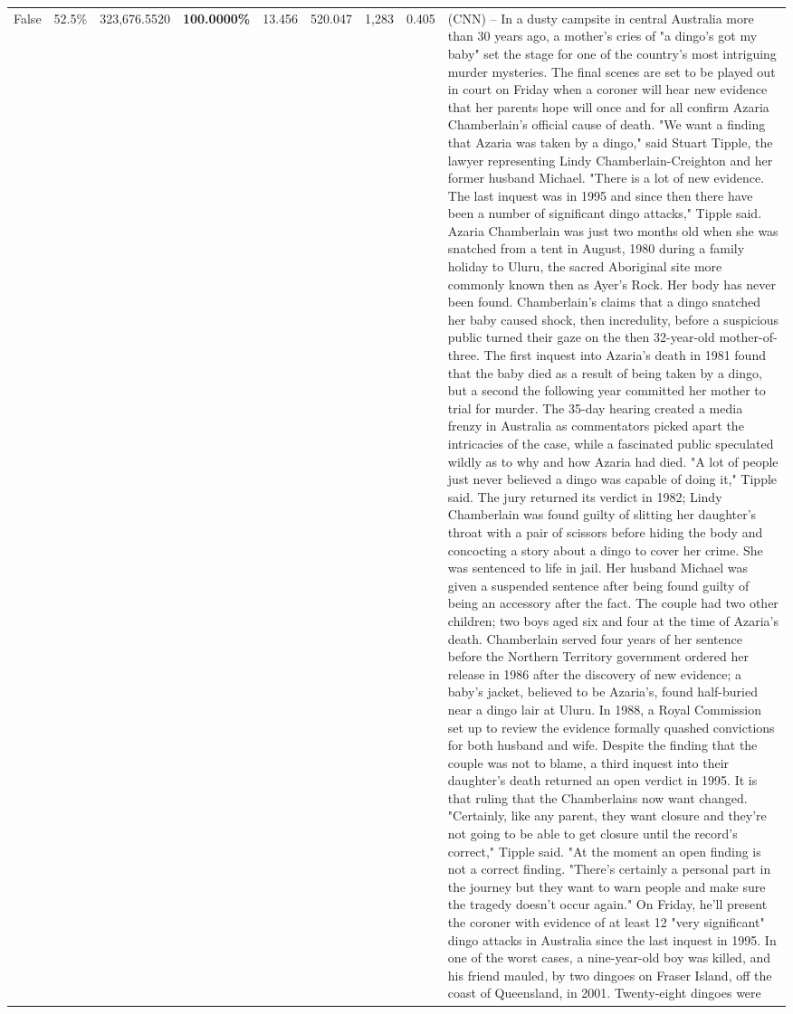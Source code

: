 \begin{table}[H]
\begin{tabular}{lllrlllll}
False & 52.5\% & 323,676.5520 & \bfseries \color{red} 100.0000\% & 13.456 & 520.047 & 1,283 & 0.405 & (CNN) -- In a dusty campsite in central Australia more than 30 years ago, a mother's cries of "a dingo's got my baby" set the stage for one of the country's most intriguing murder mysteries. The final scenes are set to be played out in court on Friday when a coroner will hear new evidence that her parents hope will once and for all confirm Azaria Chamberlain's official cause of death. "We want a finding that Azaria was taken by a dingo," said Stuart Tipple, the lawyer representing Lindy Chamberlain-Creighton and her former husband Michael. "There is a lot of new evidence. The last inquest was in 1995 and since then there have been a number of significant dingo attacks," Tipple said. Azaria Chamberlain was just two months old when she was snatched from a tent in August, 1980 during a family holiday to Uluru, the sacred Aboriginal site more commonly known then as Ayer's Rock. Her body has never been found. Chamberlain's claims that a dingo snatched her baby caused shock, then incredulity, before a suspicious public turned their gaze on the then 32-year-old mother-of-three. The first inquest into Azaria's death in 1981 found that the baby died as a result of being taken by a dingo, but a second the following year committed her mother to trial for murder. The 35-day hearing created a media frenzy in Australia as commentators picked apart the intricacies of the case, while a fascinated public speculated wildly as to why and how Azaria had died. "A lot of people just never believed a dingo was capable of doing it," Tipple said. The jury returned its verdict in 1982; Lindy Chamberlain was found guilty of slitting her daughter's throat with a pair of scissors before hiding the body and concocting a story about a dingo to cover her crime. She was sentenced to life in jail. Her husband Michael was given a suspended sentence after being found guilty of being an accessory after the fact. The couple had two other children; two boys aged six and four at the time of Azaria's death. Chamberlain served four years of her sentence before the Northern Territory government ordered her release in 1986 after the discovery of new evidence; a baby's jacket, believed to be Azaria's, found half-buried near a dingo lair at Uluru. In 1988, a Royal Commission set up to review the evidence formally quashed convictions for both husband and wife. Despite the finding that the couple was not to blame, a third inquest into their daughter's death returned an open verdict in 1995. It is that ruling that the Chamberlains now want changed. "Certainly, like any parent, they want closure and they're not going to be able to get closure until the record's correct," Tipple said. "At the moment an open finding is not a correct finding. "There's certainly a personal part in the journey but they want to warn people and make sure the tragedy doesn't occur again." On Friday, he'll present the coroner with evidence of at least 12 "very significant" dingo attacks in Australia since the last inquest in 1995. In one of the worst cases, a nine-year-old boy was killed, and his friend mauled, by two dingoes on Fraser Island, off the coast of Queensland, in 2001. Twenty-eight dingoes were 
\end{tabular}
\end{table}

